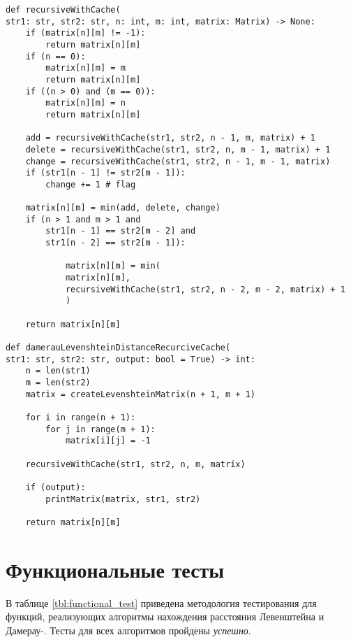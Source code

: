 \begin{center}
    \captionsetup{justification=raggedright,singlelinecheck=off}
    \begin{lstlisting}[label=lst:dam_lev_rec_cache,caption=Алгоритм нахождения расстояния Дамерау-Левенштейна (рекурсивный с использованием кеша)]
def recursiveWithCache(
str1: str, str2: str, n: int, m: int, matrix: Matrix) -> None:
	if (matrix[n][m] != -1):
		return matrix[n][m]
	if (n == 0):
		matrix[n][m] = m
		return matrix[n][m]
	if ((n > 0) and (m == 0)):
		matrix[n][m] = n
		return matrix[n][m]
	
	add = recursiveWithCache(str1, str2, n - 1, m, matrix) + 1
	delete = recursiveWithCache(str1, str2, n, m - 1, matrix) + 1
	change = recursiveWithCache(str1, str2, n - 1, m - 1, matrix)
	if (str1[n - 1] != str2[m - 1]):
		change += 1 # flag
	
	matrix[n][m] = min(add, delete, change)
	if (n > 1 and m > 1 and
		str1[n - 1] == str2[m - 2] and
		str1[n - 2] == str2[m - 1]):
	
			matrix[n][m] = min(
			matrix[n][m],
			recursiveWithCache(str1, str2, n - 2, m - 2, matrix) + 1
			)
	
	return matrix[n][m]

def damerauLevenshteinDistanceRecurciveCache(
str1: str, str2: str, output: bool = True) -> int:
	n = len(str1)
	m = len(str2)
	matrix = createLevenshteinMatrix(n + 1, m + 1)
	
	for i in range(n + 1):
		for j in range(m + 1):
			matrix[i][j] = -1
		
	recursiveWithCache(str1, str2, n, m, matrix)
	
	if (output):
		printMatrix(matrix, str1, str2)
	
	return matrix[n][m]

\end{lstlisting}
\end{center}

\section{Функциональные тесты}

В таблице \ref{tbl:functional_test} приведена методология тестирования для функций, реализующих алгоритмы нахождения расстояния Левенштейна и Дамерау-. Тесты для всех алгоритмов пройдены \textit{успешно}.


